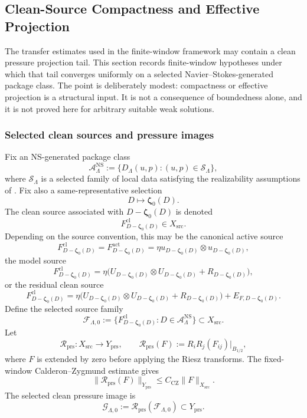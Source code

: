 \documentclass[11pt]{article}
\numberwithin{equation}{section}
\theoremstyle{definition}
\theoremstyle{remark}
\newcommand{\NS}{\mathrm{NS}}
\newcommand{\src}{\mathrm{src}}
\newcommand{\cl}{\mathrm{cl}}
\newcommand{\bzeta}{\boldsymbol\zeta}
\begin{document}
\subsection{Clean-Source Compactness and Effective Projection}
\label{sec:clean-source-compactness}

The transfer estimates used in the finite-window framework may contain a clean
pressure projection tail.  This section records finite-window hypotheses under
which that tail converges uniformly on a selected Navier--Stokes-generated
package class.  The point is deliberately modest: compactness or effective
projection is a structural input.  It is not a consequence of boundedness alone,
and it is not proved here for arbitrary suitable weak solutions.

\subsubsection{Selected clean sources and pressure images}

Fix an NS-generated package class
\[
    \mathcal A_{\Lambda}^{\NS}
    :=
    \{D_\Lambda(u,p):(u,p)\in\mathcal S_\Lambda\},
\]
where \(\mathcal S_\Lambda\) is a selected family of local data satisfying the
realizability assumptions of .  Fix also a
same-representative selection
\[
    D\longmapsto \bzeta_0(D).
\]
The clean source associated with \(D-\bzeta_0(D)\) is denoted
\[
    F^{\cl}_{D-\bzeta_0(D)}\in X_{\src}.
\]
Depending on the source convention, this may be the canonical active source
\[
    F^{\cl}_{D-\bzeta_0(D)}
    =
    F^{\mathrm{act}}_{D-\bzeta_0(D)}
    =
    \eta u_{D-\bzeta_0(D)}\otimes u_{D-\bzeta_0(D)},
\]
the model source
\[
    F^{\cl}_{D-\bzeta_0(D)}
    =
    \eta\bigl(
        U_{D-\bzeta_0(D)}\otimes U_{D-\bzeta_0(D)}
        +
        R_{D-\bzeta_0(D)}
    \bigr),
\]
or the residual clean source
\[
    F^{\cl}_{D-\bzeta_0(D)}
    =
    \eta\bigl(
        U_{D-\bzeta_0(D)}\otimes U_{D-\bzeta_0(D)}
        +
        R_{D-\bzeta_0(D)}
    \bigr)
    +
    E_{F,D-\bzeta_0(D)}.
\]
Define the selected source family
\[
    \mathcal F_{\Lambda,0}
    :=
    \{F^{\cl}_{D-\bzeta_0(D)}:D\in\mathcal A_{\Lambda}^{\NS}\}
    \subset X_{\src}.
\]
Let
\[
    \mathcal R_{\mathrm{prs}}:X_{\src}\to Y_{\mathrm{prs}},
    \qquad
    \mathcal R_{\mathrm{prs}}(F):=R_iR_j(F_{ij})|_{B_{1/2}},
\]
where \(F\) is extended by zero before applying the Riesz transforms.  The
fixed-window Calderon--Zygmund estimate gives
\[
    \|\mathcal R_{\mathrm{prs}}(F)\|_{Y_{\mathrm{prs}}}
    \le
    C_{\mathrm{CZ}}\|F\|_{X_{\src}}.
\]
The selected clean pressure image is
\[
    \mathcal G_{\Lambda,0}
    :=
    \mathcal R_{\mathrm{prs}}(\mathcal F_{\Lambda,0})
    \subset Y_{\mathrm{prs}}.
\]
\end{document}
